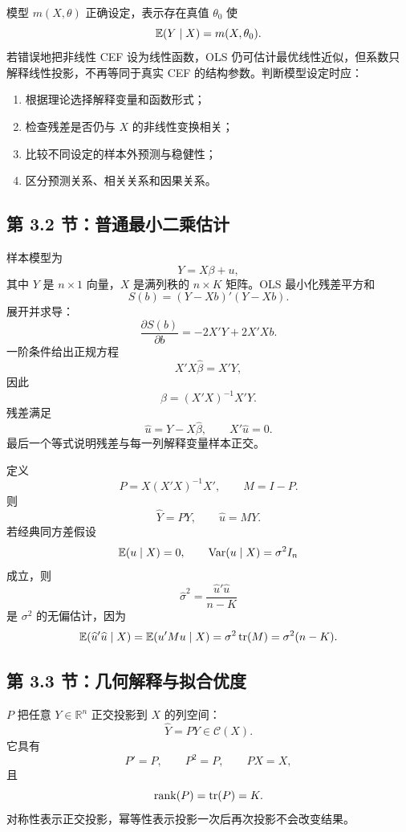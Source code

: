 \begin{proposition}\label{hw:reg:note:3:4}
模型 $m(X,\theta)$ 正确设定，表示存在真值 $\theta_0$ 使
\[
\mathbb{E}(Y\mid X)=m(X,\theta_0).
\]
若错误地把非线性 CEF 设为线性函数，OLS 仍可估计最优线性近似，但系数只解释线性投影，不再等同于真实 CEF 的结构参数。判断模型设定时应：
\begin{enumerate}
  \item 根据理论选择解释变量和函数形式；
  \item 检查残差是否仍与 $X$ 的非线性变换相关；
  \item 比较不同设定的样本外预测与稳健性；
  \item 区分预测关系、相关关系和因果关系。
\end{enumerate}
\end{proposition}

\subsection*{第 3.2 节：普通最小二乘估计}

\begin{proposition}\label{hw:reg:note:3:5}
样本模型为
\[
Y=X\beta+u,
\]
其中 $Y$ 是 $n\times1$ 向量，$X$ 是满列秩的 $n\times K$ 矩阵。OLS 最小化残差平方和
\[
S(b)=(Y-Xb)'(Y-Xb).
\]
展开并求导：
\[
\frac{\partial S(b)}{\partial b}
=-2X'Y+2X'Xb.
\]
一阶条件给出正规方程
\[
X'X\widehat\beta=X'Y,
\]
因此
\[
\boxed{\widehat\beta=(X'X)^{-1}X'Y}.
\]
残差满足
\[
\widehat u=Y-X\widehat\beta,\qquad X'\widehat u=0.
\]
最后一个等式说明残差与每一列解释变量样本正交。
\end{proposition}

\begin{proposition}\label{hw:reg:note:3:6}
定义
\[
P=X(X'X)^{-1}X',\qquad M=I-P.
\]
则
\[
\widehat Y=PY,\qquad \widehat u=MY.
\]
若经典同方差假设
\[
\mathbb{E}(u\mid X)=0,\qquad \operatorname{Var}(u\mid X)=\sigma^2I_n
\]
成立，则
\[
\widehat\sigma^2=\frac{\widehat u'\widehat u}{n-K}
\]
是 $\sigma^2$ 的无偏估计，因为
\[
\mathbb{E}(\widehat u'\widehat u\mid X)
=\mathbb{E}(u'Mu\mid X)
=\sigma^2\operatorname{tr}(M)
=\sigma^2(n-K).
\]
\end{proposition}

\subsection*{第 3.3 节：几何解释与拟合优度}

\begin{proposition}\label{hw:reg:note:3:7}
$P$ 把任意 $Y\in\mathbb R^n$ 正交投影到 $X$ 的列空间：
\[
\widehat Y=PY\in\mathcal C(X).
\]
它具有
\[
P'=P,\qquad P^2=P,\qquad PX=X,
\]
且
\[
\operatorname{rank}(P)=\operatorname{tr}(P)=K.
\]
对称性表示正交投影，幂等性表示投影一次后再次投影不会改变结果。
\end{proposition}

